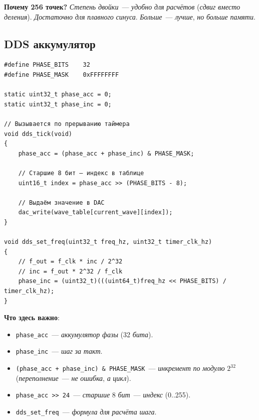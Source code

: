 \begin{keybox}
\textbf{Почему \num{256} точек?} \emph{Степень}
\emph{двойки}~--- \emph{удобно} \emph{для} \emph{расчётов}
(\emph{сдвиг} \emph{вместо} \emph{деления}). \emph{Достаточно}
\emph{для} \emph{плавного} \emph{синуса}. \emph{Больше}~---
\emph{лучше}, \emph{но} \emph{больше} \emph{памяти}.
\end{keybox}

\subsection{DDS аккумулятор}

\begin{listing}[htbp]
\begin{verbatim}
#define PHASE_BITS    32
#define PHASE_MASK    0xFFFFFFFF

static uint32_t phase_acc = 0;
static uint32_t phase_inc = 0;

// Вызывается по прерыванию таймера
void dds_tick(void)
{
    phase_acc = (phase_acc + phase_inc) & PHASE_MASK;

    // Старшие 8 бит — индекс в таблице
    uint16_t index = phase_acc >> (PHASE_BITS - 8);

    // Выдаём значение в DAC
    dac_write(wave_table[current_wave][index]);
}

void dds_set_freq(uint32_t freq_hz, uint32_t timer_clk_hz)
{
    // f_out = f_clk * inc / 2^32
    // inc = f_out * 2^32 / f_clk
    phase_inc = (uint32_t)(((uint64_t)freq_hz << PHASE_BITS) / timer_clk_hz);
}
\end{verbatim}
\caption{DDS: аккумулятор фазы и установка частоты}
\label{lst:dds-acc}
\end{listing}

\textbf{Что здесь важно}:
\begin{itemize}
    \item \texttt{phase\_acc}~--- \emph{аккумулятор}
          \emph{фазы} (\num{32} \emph{бита}).
    \item \texttt{phase\_inc}~--- \emph{шаг} \emph{за}
          \emph{такт}.
    \item \texttt{(phase\_acc + phase\_inc) \& PHASE\_MASK}~---
          \emph{инкремент} \emph{по} \emph{модулю} $2^{32}$
          (\emph{переполнение}~--- \emph{не} \emph{ошибка},
          \emph{а} \emph{цикл}).
    \item \texttt{phase\_acc >> 24}~--- \emph{старшие} \num{8}
          \emph{бит}~--- \emph{индекс} (\num{0}..\num{255}).
    \item \texttt{dds\_set\_freq}~--- \emph{формула}
          \emph{для} \emph{расчёта} \emph{шага}.
\end{itemize}

